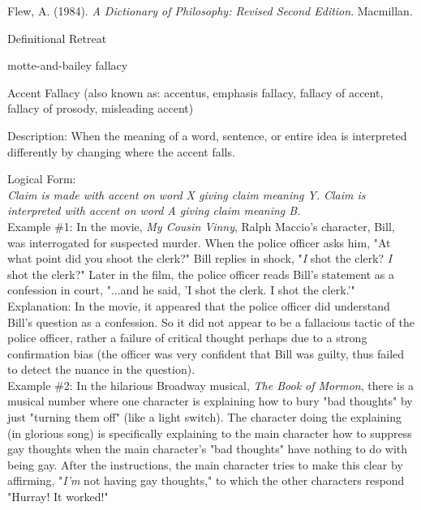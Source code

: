 \documentclass[a4paper,12pt,single,pdftex]{scrartcl}
\begin{document}
          Flew, A. (1984). {\it A Dictionary of Philosophy: Revised Second Edition}. Macmillan.
        
      
    
  

Definitional Retreat

motte-and-bailey fallacy

Accent Fallacy
    (also known as: accentus, emphasis fallacy, fallacy of accent, fallacy of prosody, misleading accent)
  
    Description: When the meaning of a word, sentence, or entire idea is interpreted differently by changing where the accent falls. \newline


    
      Logical Form:
    \\

    
      {\em Claim is made with accent on word X giving claim meaning Y.} \newline
{\em Claim is interpreted with accent on word A giving claim meaning B.}
    \\

    
      Example \#1: In the movie, {\it My Cousin Vinny}, Ralph Maccio's character, Bill, was interrogated for suspected murder. When the police officer asks him, "At what point did you shoot the clerk?" Bill replies in shock, "{\em I} shot the clerk? {\em I} shot the clerk?" Later in the film, the police officer reads Bill's statement as a confession in court, "...and he said, 'I shot the clerk. I shot the clerk.'"
    \\

    
      Explanation: In the movie, it appeared that the police officer did understand Bill's question as a confession. So it did not appear to be a fallacious tactic of the police officer, rather a failure of critical thought perhaps due to a strong confirmation bias (the officer was very confident that Bill was guilty, thus failed to detect the nuance in the question).
    \\

    
      Example \#2: In the hilarious Broadway musical, {\it The Book of Mormon}, there is a musical number where one character is explaining how to bury "bad thoughts" by just "turning them off" (like a light switch). The character doing the explaining (in glorious song) is specifically explaining to the main character how to suppress gay thoughts when the main character's "bad thoughts" have nothing to do with being gay. After the instructions, the main character tries to make this clear by affirming, "{\it I'm} not having gay thoughts," to which the other characters respond "Hurray! It worked!"
    \\
\end{document}
